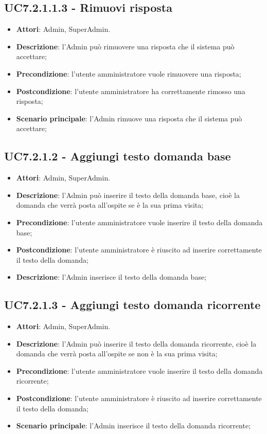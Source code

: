 \documentclass[../AnalisiDeiRequisiti_v3.0.0.tex]{subfiles}
\begin{document}
\begin{itemize}
\subsection{UC7.2.1.1.3 - Rimuovi risposta} 
\label{sssec:UC7.2.1.1.3} 
\begin{itemize} 
\item \textbf{Attori}: Admin, SuperAdmin.
\item \textbf{Descrizione}: l'Admin può rimuovere una risposta che il sistema può accettare;
\item \textbf{Precondizione}: l'utente amministratore vuole rimuovere una risposta;
\item \textbf{Postcondizione}: l'utente amministratore ha correttamente rimosso una risposta;
\item \textbf{Scenario principale}: l'Admin rimuove una risposta che il sistema può accettare;
\end{itemize}
\subsection{UC7.2.1.2 - Aggiungi testo domanda base} 
\label{sssec:UC7.2.1.2} 
\begin{itemize} 
\item \textbf{Attori}: Admin, SuperAdmin.
\item \textbf{Descrizione}: l'Admin può inserire il testo della domanda base, cioè la domanda che verrà posta all'ospite se è la sua prima visita;
\item \textbf{Precondizione}: l'utente amministratore vuole inserire il testo della domanda base;
\item \textbf{Postcondizione}: l'utente amministratore è riuscito ad inserire correttamente il testo della domanda;
\item \textbf{Descrizione}: l'Admin inserisce il testo della domanda base;
\end{itemize} 
\subsection{UC7.2.1.3 - Aggiungi testo domanda ricorrente} 
\label{sssec:UC7.2.1.3} 
\begin{itemize} 
\item \textbf{Attori}: Admin, SuperAdmin.
\item \textbf{Descrizione}: l'Admin può inserire il testo della domanda ricorrente, cioè la domanda che verrà posta all'ospite se non è la sua prima visita;
\item \textbf{Precondizione}: l'utente amministratore vuole inserire il testo della domanda ricorrente;
\item \textbf{Postcondizione}: l'utente amministratore è riuscito ad inserire correttamente il testo della domanda;
\item \textbf{Scenario principale}: l'Admin inserisce il testo della domanda ricorrente;
\end{itemize} 
\end{itemize} 
\end{document}
